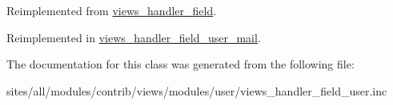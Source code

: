Reimplemented from \hyperlink{classviews__handler__field_82ff951c5e9ceb97b2eab86f880cbc1e}{views\_\-handler\_\-field}.

Reimplemented in \hyperlink{classviews__handler__field__user__mail_ab8c63fe4d09cff576f4588838dc363c}{views\_\-handler\_\-field\_\-user\_\-mail}.

The documentation for this class was generated from the following file:\begin{CompactItemize}
\item 
sites/all/modules/contrib/views/modules/user/views\_\-handler\_\-field\_\-user.inc\end{CompactItemize}
